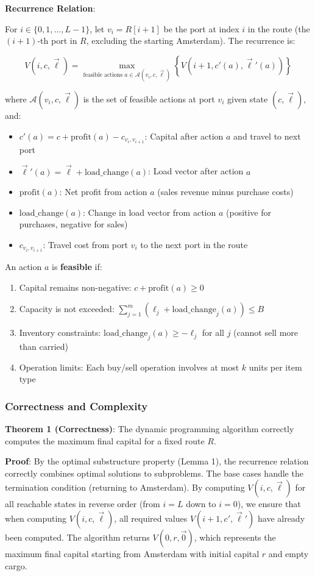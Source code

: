 \documentclass[12pt]{article}
\begin{document}
\textbf{Recurrence Relation}:

For $i \in \{0, 1, ..., L-1\}$, let $v_i = R[i+1]$ be the port at index $i$ in the route (the $(i+1)$-th port in $R$, excluding the starting Amsterdam). The recurrence is:

$$V(i, c, \vec{\ell}) = \max_{\text{feasible actions } a \in \mathcal{A}(v_i, c, \vec{\ell})} \left\{ V(i+1, c'(a), \vec{\ell}'(a)) \right\}$$

where $\mathcal{A}(v_i, c, \vec{\ell})$ is the set of feasible actions at port $v_i$ given state $(c, \vec{\ell})$, and:
\begin{itemize}
    \item $c'(a) = c + \text{profit}(a) - c_{v_i, v_{i+1}}$: Capital after action $a$ and travel to next port
    \item $\vec{\ell}'(a) = \vec{\ell} + \text{load\_change}(a)$: Load vector after action $a$
    \item $\text{profit}(a)$: Net profit from action $a$ (sales revenue minus purchase costs)
    \item $\text{load\_change}(a)$: Change in load vector from action $a$ (positive for purchases, negative for sales)
    \item $c_{v_i, v_{i+1}}$: Travel cost from port $v_i$ to the next port in the route
\end{itemize}

An action $a$ is \textbf{feasible} if:
\begin{enumerate}
    \item Capital remains non-negative: $c + \text{profit}(a) \geq 0$
    \item Capacity is not exceeded: $\sum_{j=1}^{m} (\ell_j + \text{load\_change}_j(a)) \leq B$
    \item Inventory constraints: $\text{load\_change}_j(a) \geq -\ell_j$ for all $j$ (cannot sell more than carried)
    \item Operation limits: Each buy/sell operation involves at most $k$ units per item type
\end{enumerate}

\subsubsection{Correctness and Complexity}

\textbf{Theorem 1 (Correctness)}: The dynamic programming algorithm correctly computes the maximum final capital for a fixed route $R$.

\textbf{Proof}: By the optimal substructure property (Lemma 1), the recurrence relation correctly combines optimal solutions to subproblems. The base cases handle the termination condition (returning to Amsterdam). By computing $V(i, c, \vec{\ell})$ for all reachable states in reverse order (from $i = L$ down to $i = 0$), we ensure that when computing $V(i, c, \vec{\ell})$, all required values $V(i+1, c', \vec{\ell}')$ have already been computed. The algorithm returns $V(0, r, \vec{0})$, which represents the maximum final capital starting from Amsterdam with initial capital $r$ and empty cargo.
\end{document}
